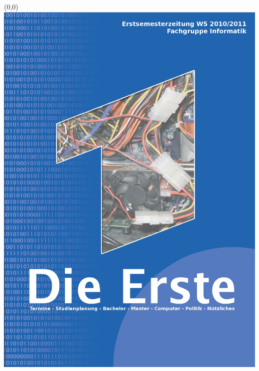 \begin{titlepage}
\ifpdf
\begin{textblock}{3}(0,0)
\includegraphics[width=\paperwidth]{bilder/titelseite.jpg}
\end{textblock}
\leavevmode\newpage 
%
\else

\end{titlepage}
